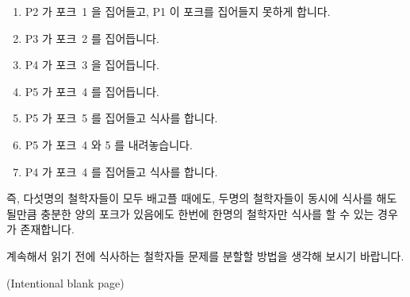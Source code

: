 \begin{enumerate}
\item	P2 가 포크~1 을 집어들고, P1 이 포크를 집어들지 못하게 합니다.
\item	P3 가 포크~2 를 집어듭니다.
\item	P4 가 포크~3 을 집어듭니다.
\item	P5 가 포크~4 를 집어듭니다.
\item	P5 가 포크~5 를 집어들고 식사를 합니다.
\item	P5 가 포크~4 와 5 를 내려놓습니다.
\item	P4 가 포크~4 를 집어들고 식사를 합니다.
\end{enumerate}

즉, 다섯명의 철학자들이 모두 배고플 때에도, 두명의 철학자들이 동시에 식사를
해도 될만큼 충분한 양의 포크가 있음에도 한번에 한명의 철학자만 식사를 할 수
있는 경우가 존재합니다.

계속해서 읽기 전에 식사하는 철학자들 문제를 분할할 방법을 생각해 보시기
바랍니다.

\pagebreak
(Intentional blank page)
\cleardoublepage

